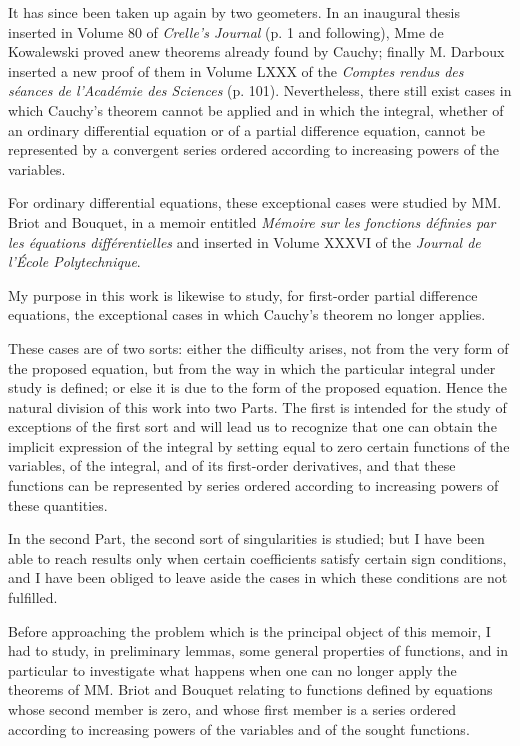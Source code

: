 \documentclass[11pt]{article}
\begin{document}
It has since been taken up again by two geometers. In an inaugural thesis inserted in Volume 80 of \emph{Crelle's Journal} (p. 1 and following), Mme de Kowalewski proved anew theorems already found by Cauchy; finally M. Darboux inserted a new proof of them in Volume LXXX of the \emph{Comptes rendus des séances de l'Académie des Sciences} (p. 101). Nevertheless, there still exist cases in which Cauchy's theorem cannot be applied and in which the integral, whether of an ordinary differential equation or of a partial difference equation, cannot be represented by a convergent series ordered according to increasing powers of the variables.

For ordinary differential equations, these exceptional cases were studied by MM. Briot and Bouquet, in a memoir entitled \emph{Mémoire sur les fonctions définies par les équations différentielles} and inserted in Volume XXXVI of the \emph{Journal de l'École Polytechnique}.

My purpose in this work is likewise to study, for first-order partial difference equations, the exceptional cases in which Cauchy's theorem no longer applies.

These cases are of two sorts: either the difficulty arises, not from the very form of the proposed equation, but from the way in which the particular integral under study is defined; or else it is due to the form of the proposed equation. Hence the natural division of this work into two Parts. The first is intended for the study of exceptions of the first sort and will lead us to recognize that one can obtain the implicit expression of the integral by setting equal to zero certain functions of the variables, of the integral, and of its first-order derivatives, and that these functions can be represented by series ordered according to increasing powers of these quantities.

In the second Part, the second sort of singularities is studied; but I have been able to reach results only when certain coefficients satisfy certain sign conditions, and I have been obliged to leave aside the cases in which these conditions are not fulfilled.

Before approaching the problem which is the principal object of this memoir, I had to study, in preliminary lemmas, some general properties of functions, and in particular to investigate what happens when one can no longer apply the theorems of MM. Briot and Bouquet relating to functions defined by equations whose second member is zero, and whose first member is a series ordered according to increasing powers of the variables and of the sought functions.
\end{document}
